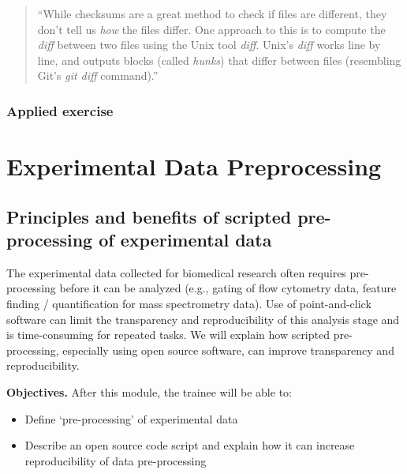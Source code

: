 \documentclass[]{tufte-book}
\providecommand{\tightlist}{%
  \setlength{\itemsep}{0pt}\setlength{\parskip}{0pt}}
\begin{document}
\begin{quote}
``While checksums are a great method to check if files are different, they don't tell
us \emph{how} the files differ. One approach to this is to compute the \emph{diff} between
two files using the Unix tool \emph{diff}. Unix's \emph{diff} works line by line, and outputs
blocks (called \emph{hunks}) that differ between files (resembling Git's \emph{git diff} command).''
\citep{buffalo2015bioinformatics}
\end{quote}

\hypertarget{applied-exercise}{%
\subsection{Applied exercise}\label{applied-exercise}}

\hypertarget{experimental-data-preprocessing}{%
\chapter{Experimental Data Preprocessing}\label{experimental-data-preprocessing}}

\hypertarget{principles-and-benefits-of-scripted-pre-processing-of-experimental-data}{%
\section{Principles and benefits of scripted pre-processing of experimental data}\label{principles-and-benefits-of-scripted-pre-processing-of-experimental-data}}

The experimental data collected for biomedical research often requires
pre-processing before it can be analyzed (e.g., gating of flow cytometry data,
feature finding / quantification for mass spectrometry data). Use of
point-and-click software can limit the transparency and reproducibility of this
analysis stage and is time-consuming for repeated tasks. We will explain how
scripted pre-processing, especially using open source software, can improve
transparency and reproducibility.

\textbf{Objectives.} After this module, the trainee will be able to:

\begin{itemize}
\tightlist
\item
  Define `pre-processing' of experimental data
\item
  Describe an open source code script and explain how it can increase
  reproducibility of data pre-processing
\end{itemize}
\end{document}
